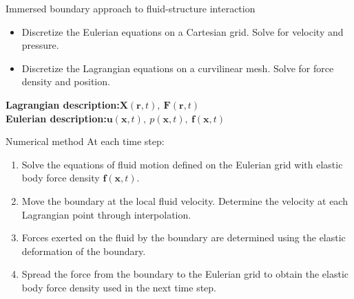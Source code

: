 \documentclass{beamer}
\begin{document}
\begin{frame}{Immersed boundary approach to fluid-structure interaction}
\small
\begin{itemize}
    \item Discretize the Eulerian equations on a Cartesian grid. Solve for velocity and pressure.
    \item Discretize the Lagrangian equations on a curvilinear mesh. Solve for force density and position.
\end{itemize}

\medskip
\begin{center}
\textbf{Lagrangian description:}\quad $ \mathbf{X}(\mathbf{r},t),\ \mathbf{F}(\mathbf{r},t)$\\
\textbf{Eulerian description:}\quad $\mathbf{u}(\mathbf{x},t),\ p(\mathbf{x},t),\ \mathbf{f}(\mathbf{x},t)$
\end{center}
\end{frame}

\begin{frame}{Numerical method}
\small
At each time step:
\begin{enumerate}
    \item Solve the equations of fluid motion defined on the Eulerian grid with elastic body force density $\mathbf{f}(\mathbf{x},t)$.
    \item Move the boundary at the local fluid velocity. Determine the velocity at each Lagrangian point through interpolation.
    \item Forces exerted on the fluid by the boundary are determined using the elastic deformation of the boundary.
    \item Spread the force from the boundary to the Eulerian grid to obtain the elastic body force density used in the next time step.
\end{enumerate}
\end{frame}
\end{document}
